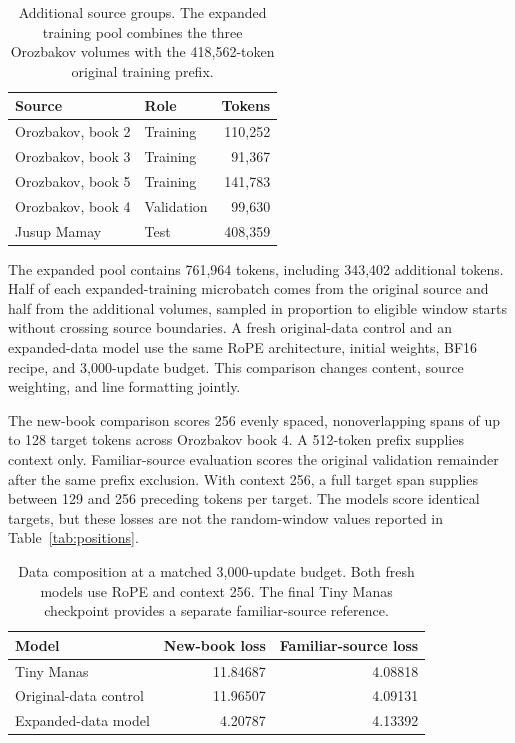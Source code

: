 \documentclass{article}
\begin{document}
\begin{table}[ht]
\caption{Additional source groups. The expanded training pool combines the three Orozbakov volumes with the 418,562-token original training prefix.}
\label{tab:books}\centering\small
\begin{tabular}{llr}
\toprule Source & Role & Tokens \\
\midrule
Orozbakov, book 2 & Training & 110,252 \\
Orozbakov, book 3 & Training & 91,367 \\
Orozbakov, book 5 & Training & 141,783 \\
Orozbakov, book 4 & Validation & 99,630 \\
Jusup Mamay & Test & 408,359 \\
\bottomrule
\end{tabular}
\end{table}

The expanded pool contains 761,964 tokens, including 343,402 additional tokens. Half of each expanded-training microbatch comes from the original source and half from the additional volumes, sampled in proportion to eligible window starts without crossing source boundaries. A fresh original-data control and an expanded-data model use the same RoPE architecture, initial weights, BF16 recipe, and 3,000-update budget. This comparison changes content, source weighting, and line formatting jointly.

The new-book comparison scores 256 evenly spaced, nonoverlapping spans of up to 128 target tokens across Orozbakov book 4. A 512-token prefix supplies context only. Familiar-source evaluation scores the original validation remainder after the same prefix exclusion. With context 256, a full target span supplies between 129 and 256 preceding tokens per target. The models score identical targets, but these losses are not the random-window values reported in Table~\ref{tab:positions}.

\begin{table}[ht]
\caption{Data composition at a matched 3,000-update budget. Both fresh models use RoPE and context 256. The final Tiny Manas checkpoint provides a separate familiar-source reference.}
\label{tab:data-results}\centering\small
\begin{tabular}{lrr}
\toprule Model & New-book loss & Familiar-source loss \\
\midrule
Tiny Manas & 11.84687 & 4.08818 \\
Original-data control & 11.96507 & 4.09131 \\
Expanded-data model & 4.20787 & 4.13392 \\
\bottomrule
\end{tabular}
\end{table}
\end{document}
